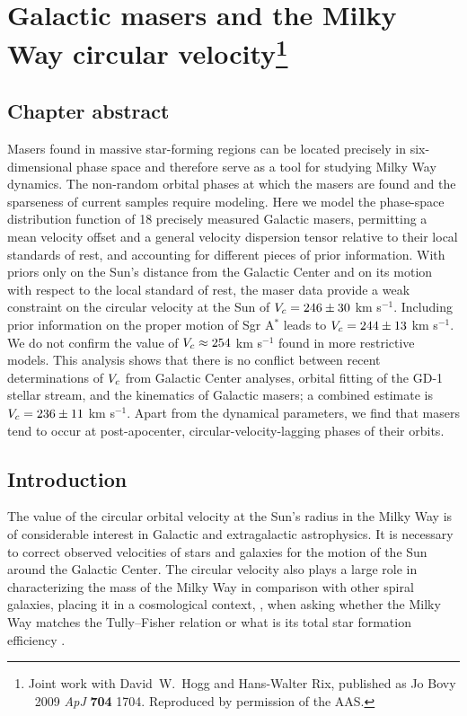 \chapter[Galactic masers and the Milky Way circular velocity]{Galactic masers and the Milky Way circular velocity\protect\footnote{Joint work with David~W.~Hogg and Hans-Walter Rix, published as Jo Bovy \etal\ 2009 \emph{ApJ} {\bf 704} 1704. Reproduced by permission of the AAS.}\label{chap:masers}}

\section{Chapter abstract}
Masers found in massive star-forming regions can be located precisely
in six-dimensional phase space and therefore serve as a tool for
studying Milky Way dynamics. The non-random orbital phases at which
the masers are found and the sparseness of current samples require
modeling. Here we model the phase-space distribution function of 18
precisely measured Galactic masers, permitting a mean velocity offset
and a general velocity dispersion tensor relative to their local
standards of rest, and accounting for different pieces of prior
information. With priors only on the Sun's distance from the Galactic
Center and on its motion with respect to the local standard of rest,
the maser data provide a weak constraint on the circular velocity at
the Sun of $V_c = 246 \pm 30$ km s$^{-1}$. Including prior information
on the proper motion of Sgr A$^*$ leads to $V_c = 244 \pm 13$ km
s$^{-1}$.  We do not confirm the value of $V_c \approx 254$ km
s$^{-1}$ found in more restrictive models.  This analysis shows that
there is no conflict between recent determinations of $V_c$ from
Galactic Center analyses, orbital fitting of the GD-1 stellar stream,
and the kinematics of Galactic masers; a combined estimate is $V_c =
236 \pm 11$ km s$^{-1}$. Apart from the dynamical parameters, we find
that masers tend to occur at post-apocenter, circular-velocity-lagging
phases of their orbits.


\section{Introduction}

The value of the circular orbital velocity at the Sun's radius in the
Milky Way is of considerable interest in Galactic and extragalactic
astrophysics. It is necessary to correct observed velocities of stars
and galaxies for the motion of the Sun around the Galactic Center. The
circular velocity also plays a large role in characterizing the mass
of the Milky Way in comparison with other spiral galaxies, placing it
in a cosmological context, \eg, when asking whether the Milky Way
matches the Tully--Fisher relation \citep[\eg][]{Klypin02a,Flynn06a}
or what is its total star formation efficiency
\citep[\eg,][]{Smith07a,Xue08a}.

